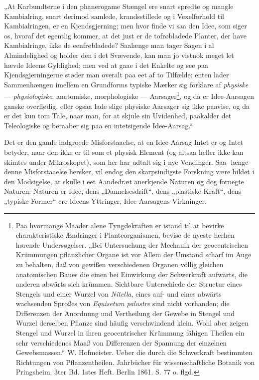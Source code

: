 \documentclass[12pt,a4paper]{book}
\begin{document}
„At Karbundterne i den phanerogame Stængel ere snart spredte og mangle
Kambialring, snart derimod samlede, krandsstillede og i Vexelforhold til
Kambialringen, er en Kjendsgjerning; men hvor finde vi saa den Idee, som
siger os, hvoraf det
\setcounter{footnote}{0}
egentlig kommer, at det just er de tofrøbladede Planter, der have
Kambialringe, ikke de eenfrøbladede? Saalænge man tager Sagen i al
Almindelighed og holder den i det Svævende, kan man jo vistnok meget let
hævde Ideens Gyldighed; men ved at gaae i det Enkelte og see paa
Kjendsgjerningerne støder man overalt paa eet af to Tilfælde: enten
lader Sammenhængen imellem en Grundforms typiske Mærker sig forklare af
\emph{physiske} --- \emph{physiologiske}, anatomiske, morphologiske ---
Aarsager\footnote{Paa hvormange Maader alene Tyngdekraften er istand til
at bevirke charakteristiske Ændringer i Planteorganismen, bevise de
nyeste herhen hørende Undersøgelser. „Bei Untersuchung der Mechanik der
geocentrischen Krümmungen pflanzlicher Organe ist vor Allem der Umstand
scharf im Auge zu behalten, daß von gewißen verschiedenen Organen völlig
gleichen anatomischen Baues die einen bei Einwirkung der Schwerkraft
aufwärts, die anderen abwärts sich krümmen. Sichtbare Unterschiede der
Structur eines Stengels und einer Wurzel von \textit{Nitella}, eines
auf- und eines abwärts wachsenden Sproßes von \textit{Equisetum
palustre} sind nicht vorhanden; die Differenzen der Anordnung und
Vertheilung der Gewebe in Stengel und Wurzel derselben Pflanze sind
häufig verschwindend klein. Wohl aber zeigen Stengel und Wurzel in ihren
geocentrischer Krümmung fähigen Theilen ein sehr verschiedenes Maaß von
Differenzen der Spannung der einzelnen Gewebsmassen.“ W. Hofmeister.
Ueber die durch die Schwerkraft bestimmten Richtungen von
Pflanzentheilen. Jahrbücher für wissenschaftliche Botanik von
Pringsheim. 3ter Bd. 1stes Heft. Berlin 1861. S. 77 o. flgd.}, og da er
Idee-Aarsagen ganske overflødig, eller ogsaa lade slige physiske
Aarsager sig ikke paavise, og da er det kun tom Tale, naar man, for at
skjule sin Uvidenhed, paakalder det Teleologiske og beraaber sig paa en
intetsigende Idee-Aarsag.“

Det er den gamle indgroede Misforstaaelse, at en Idee-Aarsag Intet er og
Intet betyder, naar den ikke er til som et physisk Element (og altsaa
heller ikke kan skimtes under Mikroskopet), som her har udtalt sig i nye
Vendinger. Saa-
\setcounter{footnote}{0}
længe denne Misforstaaelse hersker, vil endog den skarpsindigste
Forskning være hildet i den Modsigelse, at skulle i eet Aandedræt
anerkjende Naturen og dog fornegte Naturen: Naturen er Idee, dens
„Dannelsesdrift“, dens „plastiske Kraft“, dens „typiske Former“ ere
Ideens Yttringer, Idee-Aarsagens Virkninger.
\end{document}
